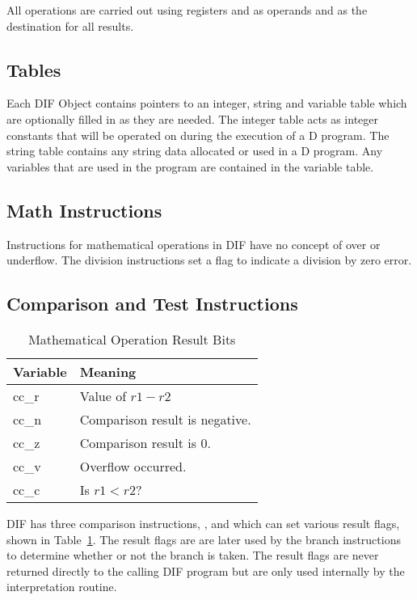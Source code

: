 All operations are carried out using registers  and
 as operands and  as the destination for
all results.

\subsection{Tables}
\label{sec:dif-tables}

Each DIF Object contains pointers to an integer, string and variable
table which are optionally filled in as they are needed.  The integer
table acts as integer constants that will be operated on during the
execution of a D program.  The string table contains any string data
allocated or used in a D program.  Any variables that are used in the
program are contained in the variable table.

\subsection{Math Instructions}
\label{sec:dif-math}

Instructions for mathematical operations in DIF have no concept of
over or underflow.  The division instructions set a flag to indicate a
division by zero error.

\subsection{Comparison and Test Instructions}
\label{sec:dif-cmp-tst}

\begin{table}
  \centering
    \begin{tabular}{|l|l|}
      \hline
      Variable & Meaning\\
      \hline
      cc\_r & Value of $r1 - r2$\\
      cc\_n & Comparison result is negative. \\
      cc\_z & Comparison result is 0.\\
      cc\_v & Overflow occurred.\\
      cc\_c & Is $r1 < r2$?\\
      \hline
  \end{tabular}
\label{tbl:cmp-vars}
\caption{Mathematical Operation Result Bits}
\end{table}

DIF has three comparison instructions, ,  and
 which can set various result flags, shown in
Table~\ref{tbl:cmp-vars}.  The result flags are are later used by the
branch instructions to determine whether or not the branch is taken.
The result flags are never returned directly to the calling DIF program but are
only used internally by the interpretation routine.

